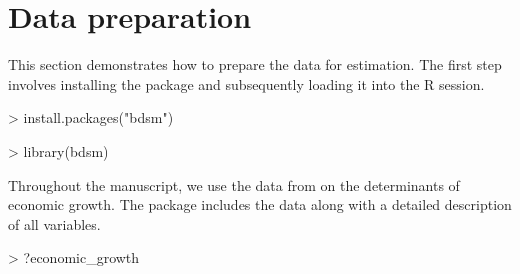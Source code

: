 \documentclass[a4paper]{article}
\begin{document}
\section{Data preparation}\label{data}
This section demonstrates how to prepare the data for estimation. The first step involves installing the package and subsequently loading it into the R session.
\begin{Schunk}
\begin{Sinput}
> install.packages("bdsm")
\end{Sinput}
\end{Schunk}
\begin{Schunk}
\begin{Sinput}
> library(bdsm)
\end{Sinput}
\end{Schunk}
Throughout the manuscript, we use the data from \citet{Moral+2016} on the determinants of economic growth. The package includes the data along with a detailed description of all variables.
\begin{Schunk}
\begin{Sinput}
> ?economic_growth
\end{Sinput}
\end{Schunk}
\end{document}
